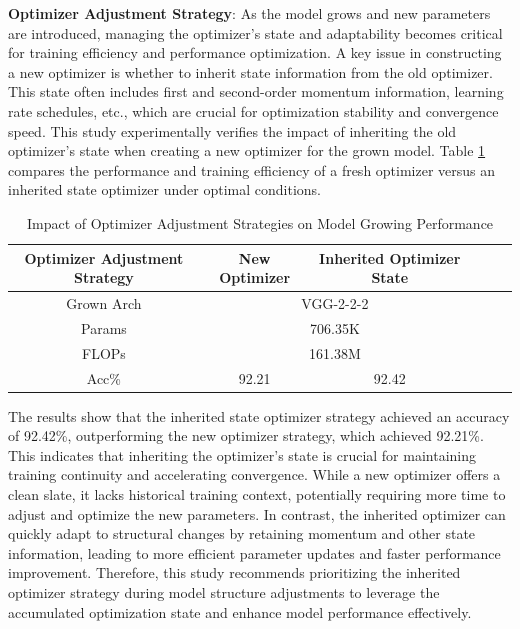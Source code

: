 \documentclass[preprint,12pt]{elsarticle}
\begin{document}
\textbf{Optimizer Adjustment Strategy}: As the model grows and new parameters are introduced, managing the optimizer's state \cite{optimizer} and adaptability becomes critical for training efficiency and performance optimization. A key issue in constructing a new optimizer is whether to inherit state information from the old optimizer. This state often includes first and second-order momentum information, learning rate schedules, etc., which are crucial for optimization stability and convergence speed. This study experimentally verifies the impact of inheriting the old optimizer's state when creating a new optimizer for the grown model. Table \ref{table:optimizer_adjustment} compares the performance and training efficiency of a fresh optimizer versus an inherited state optimizer under optimal conditions.

\begin{table}[ht]
\centering
\tiny
\renewcommand{\arraystretch}{1.3}
\begin{adjustbox}{center}
\begin{tabular}{c|ccccc}
\hline
\textbf{Optimizer Adjustment Strategy} & \textbf{New Optimizer} & \textbf{Inherited Optimizer State} \\
\hline
Grown Arch & \multicolumn{2}{c}{VGG-2-2-2} \\
\hline
Params & \multicolumn{2}{c}{706.35K} \\
\hline
FLOPs & \multicolumn{2}{c}{161.38M} \\
\hline
Acc\% & 92.21 & 92.42 \\
\hline
\end{tabular}
\end{adjustbox}
\caption{Impact of Optimizer Adjustment Strategies on Model Growing Performance}
\label{table:optimizer_adjustment}
\end{table}

The results show that the inherited state optimizer strategy achieved an accuracy of 92.42\%, outperforming the new optimizer strategy, which achieved 92.21\%. This indicates that inheriting the optimizer's state is crucial for maintaining training continuity and accelerating convergence. While a new optimizer offers a clean slate, it lacks historical training context, potentially requiring more time to adjust and optimize the new parameters. In contrast, the inherited optimizer can quickly adapt to structural changes by retaining momentum and other state information, leading to more efficient parameter updates and faster performance improvement. Therefore, this study recommends prioritizing the inherited optimizer strategy during model structure adjustments to leverage the accumulated optimization state and enhance model performance effectively.
\end{document}
